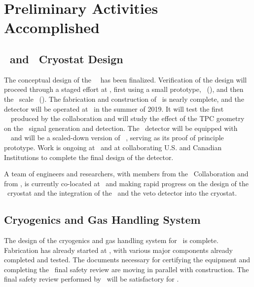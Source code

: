 \section{Preliminary Activities Accomplished}
\label{sec:PreActivities}


\subsection{\LArTPC\ and \pDUNE\ Cryostat Design}
\label{sec:TPC-Cryostat}

The conceptual design of the \DSks\ \LArTPC\ has been finalized.  Verification of the design will proceed through a staged effort at \CERN, first using a small prototype, \DSz\ (\DSzs), and then the \DSpApproximateMass\ scale \DSp\ (\DSps). The fabrication and construction of \DSzs\ is nearly complete, and the detector will be operated at \CERN\ in the summer of 2019. It will test the first \DSkPdmsFirstBatchNumber~\DSkPdms\ produced by the collaboration and will study the effect of the TPC geometry on the \STwo\ signal generation and detection.  The \DSps\ detector will be equipped with \DSkPdmsSecondBatchNumber~\DSkPdms\ and will be a scaled-down version of \DSks\ \LArTPC, serving as its proof of principle prototype. Work is ongoing at \CERN\ and at collaborating U.S. and Canadian Institutions to complete the final design of the detector.

A team of engineers and researchers, with members from the \GADMC\ Collaboration and from \CERN, is currently co-located at \CERN\ and making rapid progress on the design of the \pDUNE\ cryostat and the integration of the \LArTPC\ and the veto detector into the cryostat.

\subsection{Cryogenics and Gas Handling System}
\label{sec:Cryogenics}

The design of the cryogenics and gas handling system for \DSks\ is complete.  Fabrication has already started at \CERN, with various major components already completed and tested. The documents necessary for certifying the equipment and completing the \CERN\ final safety review are moving in parallel with construction. The final safety review performed by \CERN\ will be satisfactory for \LNGS.


